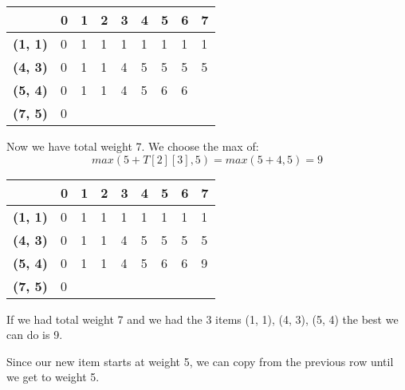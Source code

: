 \documentclass{article}
\begin{document}
\begin{center}
\begin{tabular}{|l|l|l|l|l|l|l|l|l|}
\hline
                & \textbf{0} & \textbf{1} & \textbf{2} & \textbf{3} & \textbf{4} & \textbf{5} & \textbf{6} & \textbf{7} \\ \hline
\textbf{(1, 1)} & 0          &1            &1            &1            &1            &1            &1            &1            \\ \hline
\textbf{(4, 3)} & 0          &1            &1            &4            &5            &5            &  5          &  5          \\ \hline
\textbf{(5, 4)} & 0          &1            &1            &4            &5            &6            &6            &            \\ \hline
\textbf{(7, 5)} & 0          &            &            &            &            &            &            &            \\ \hline
\end{tabular}
\end{center}
Now we have total weight 7. We choose the max of:
$$max(5 + T[2][3], 5) = max(5 + 4, 5) = 9$$
\begin{center}
\begin{tabular}{|l|l|l|l|l|l|l|l|l|}
\hline
                & \textbf{0} & \textbf{1} & \textbf{2} & \textbf{3} & \textbf{4} & \textbf{5} & \textbf{6} & \textbf{7} \\ \hline
\textbf{(1, 1)} & 0          &1            &1            &1            &1            &1            &1            &1            \\ \hline
\textbf{(4, 3)} & 0          &1            &1            &4            &5            &5            &  5          &  5          \\ \hline
\textbf{(5, 4)} & 0          &1            &1            &4            &5            &6            &6            & 9           \\ \hline
\textbf{(7, 5)} & 0          &            &            &            &            &            &            &            \\ \hline
\end{tabular}
\end{center}
If we had total weight 7 and we had the 3 items (1, 1), (4, 3), (5, 4) the best we can do is 9.

Since our new item starts at weight 5, we can copy from the previous row until we get to weight 5.
\end{document}
